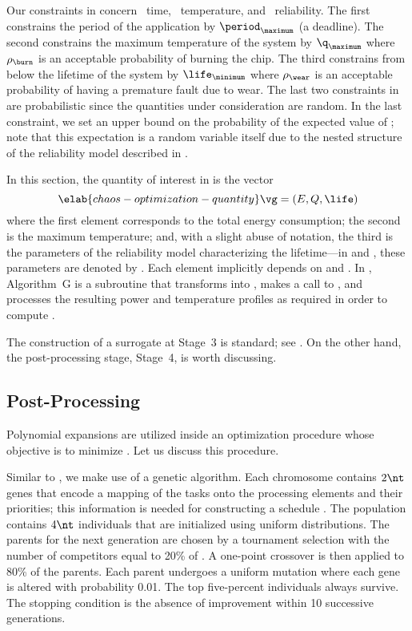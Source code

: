 Our constraints in  concern \one~time,
\two~temperature, and \three~reliability. The first constrains the period of the
application by $\period_\maximum$ (a deadline). The second constrains the
maximum temperature of the system by $\q_\maximum$ where $\rho_\burn$ is an
acceptable probability of burning the chip. The third constrains from below the
lifetime of the system by $\life_\minimum$ where $\rho_\wear$ is an acceptable
probability of having a premature fault due to wear. The last two constraints in
 are probabilistic since the quantities
under consideration are random. In the last constraint, we set an upper bound on
the probability of the expected value of \life; note that this expectation is a
random variable itself due to the nested structure of the reliability model
described in .

In this section, the quantity of interest \g in  is the
vector
\begin{equation} \elab{chaos-optimization-quantity}
  \vg = (E, Q, \life)
\end{equation}
where the first element corresponds to the total energy consumption; the second
is the maximum temperature; and, with a slight abuse of notation, the third is
the parameters of the reliability model characterizing the lifetime---in
 and , these parameters
are denoted by \vg. Each element implicitly depends on \schedule and \vu. In
, Algorithm~G is a subroutine that transforms \vz into
\vu, makes a call to , and processes
the resulting power and temperature profiles as required in order to compute
\vg.

The construction of a surrogate at Stage~3 is standard; see
. On the other hand, the post-processing stage,
Stage~4, is worth discussing.

\subsection{Post-Processing}

Polynomial expansions are utilized inside an optimization procedure whose
objective is to minimize . Let us discuss
this procedure.

Similar to , we make use of a genetic algorithm.
Each chromosome contains $2 \nt$ genes that encode a mapping of the tasks onto
the processing elements and their priorities; this information is needed for
constructing a schedule \schedule. The population contains $4 \nt$ individuals
that are initialized using uniform distributions. The parents for the next
generation are chosen by a tournament selection with the number of competitors
equal to 20\% of \nt. A one-point crossover is then applied to 80\% of the
parents. Each parent undergoes a uniform mutation where each gene is altered
with probability 0.01. The top five-percent individuals always survive. The
stopping condition is the absence of improvement within 10 successive
generations.

